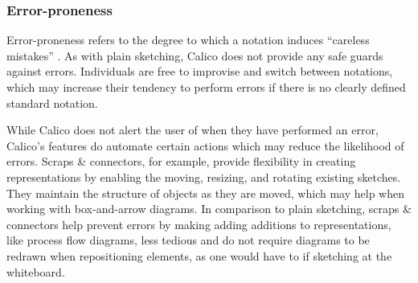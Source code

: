 %

\subsubsection{Error-proneness}

Error-proneness refers to the degree to which a notation induces ``careless mistakes'' \cite{Petre2013BookChapter}. As with plain sketching, Calico does not provide any safe guards against errors. Individuals are free to improvise and switch between notations, which may increase their tendency to perform errors if there is no clearly defined standard notation. 

While Calico does not alert the user of when they have performed an error, Calico's features do automate certain actions which may reduce the likelihood of errors. Scraps \& connectors, for example, provide flexibility in creating representations by enabling the moving, resizing, and rotating existing sketches. They maintain the structure of objects as they are moved, which may help when working with box-and-arrow diagrams. In comparison to plain sketching, scraps \& connectors help prevent errors by making adding additions to representations, like process flow diagrams, less tedious and do not require diagrams to be redrawn when repositioning elements, as one would have to if sketching at the whiteboard.



